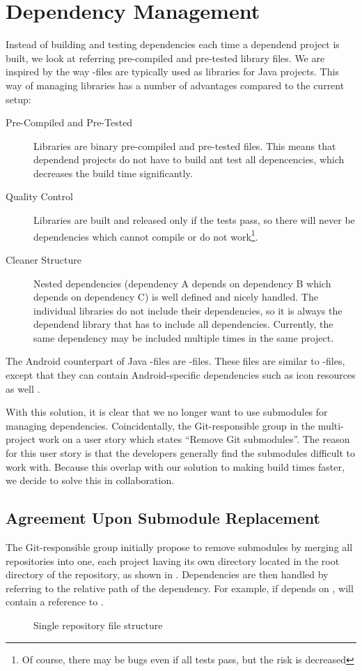 \section{Dependency Management}
Instead of building and testing dependencies each time a dependend project is built, we look at referring pre-compiled and pre-tested library files. We are inspired by the way -files are typically used as libraries for Java projects. This way of managing libraries has a number of advantages compared to the current setup:
\begin{description}
  \item [Pre-Compiled and Pre-Tested] Libraries are binary pre-compiled and pre-tested files. This means that dependend projects do not have to build ant test all depencencies, which decreases the build time significantly.
  \item[Quality Control] Libraries are built and released only if the tests pass, so there will never be dependencies which cannot compile or do not work\footnote{Of course, there may be bugs even if all tests pass, but the risk is decreased}.
  \item[Cleaner Structure] Nested dependencies (dependency A depends on dependency B which depends on dependency C) is well defined and nicely handled. The individual libraries do not include their dependencies, so it is always the dependend library that has to include all dependencies. Currently, the same dependency may be included multiple times in the same project.
\end{description}
The Android counterpart of Java -files are -files. These files are similar to -files, except that they can contain Android-specific dependencies such as icon resources as well \parencite{android-aar}.

With this solution, it is clear that we no longer want to use submodules for managing dependencies. Coincidentally, the Git-responsible group in the multi-project work on a user story which states ``Remove Git submodules''. The reason for this user story is that the developers generally find the submodules difficult to work with. Because this overlap with our solution to making build times faster, we decide to solve this in collaboration.

\subsection{Agreement Upon Submodule Replacement}
The Git-responsible group initially propose to remove submodules by merging all repositories into one, each project having its own directory located in the root directory of the repository, as shown in . Dependencies are then handled by referring to the relative path of the dependency. For example, if  depends on ,  will contain a reference to .
\begin{figure}
\caption{Single repository file structure} \label{fig:single_repo_structure}
\end{figure}

